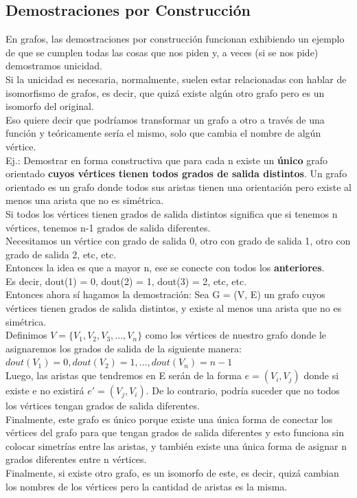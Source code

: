 \documentclass[10pt,a4paper]{article}
\begin{document}
\subsection*{Demostraciones por Construcción}
En grafos, las demostraciones por construcción funcionan exhibiendo un ejemplo de que se cumplen todas las cosas que nos piden y, a veces (si se nos pide) demostramos unicidad. \\
Si la unicidad es necesaria, normalmente, suelen estar relacionadas con hablar de isomorfismo de grafos, es decir, que quizá existe algún otro grafo pero es un isomorfo del original. \\
Eso quiere decir que podríamos transformar un grafo a otro a través de una función y teóricamente sería el mismo, solo que cambia el nombre de algún vértice. \\
Ej.: Demostrar en forma constructiva que para cada n existe un \textbf{único} grafo orientado \textbf{cuyos vértices tienen todos grados de salida distintos}. Un grafo orientado es un grafo donde todos sus aristas tienen una orientación pero existe al menos una arista que no es simétrica. \\
Si todos los vértices tienen grados de salida distintos significa que si tenemos n vértices, tenemos n-1 grados de salida diferentes. \\
Necesitamos un vértice con grado de salida 0, otro con grado de salida 1, otro con grado de salida 2, etc, etc. \\
Entonces la idea es que a mayor n, ese se conecte con todos los \textbf{anteriores}. \\
Es decir, dout(1) = 0, dout(2) = 1, dout(3) = 2, etc, etc. \\
Entonces ahora sí hagamos la demostración: Sea G = (V, E) un grafo cuyos vértices tienen grados de salida distintos, y existe al menos una arista que no es simétrica. \\
Definimos $ V = \{V_{1}, V_{2}, V_{3}, ..., V_{n}\}$ como los vértices de nuestro grafo donde le asignaremos los grados de salida de la siguiente manera: $dout(V_{1}) = 0, dout(V_{2}) = 1, \dots, dout(V_{n}) = n-1$ \\
Luego, las aristas que tendremos en E serán de la forma $e = (V_{i}, V_{j})$ donde si existe e no existirá $e' = (V_{j}, V_{i})$. De lo contrario, podría suceder que no todos los vértices tengan grados de salida diferentes. \\
Finalmente, este grafo es único porque existe una única forma de conectar los vértices del grafo para que tengan grados de salida diferentes y esto funciona sin colocar simetrías entre las aristas, y también existe una única forma de asignar n grados diferentes entre n vértices. \\
Finalmente, si existe otro grafo, es un isomorfo de este, es decir, quizá cambian los nombres de los vértices pero la cantidad de aristas es la misma. \\
\end{document}
